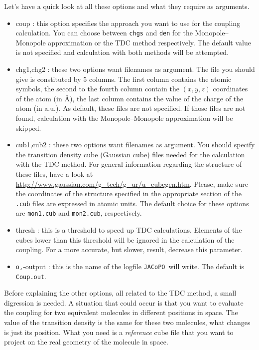\documentclass[a4paper]{article}
\newcommand{\jacopo}{\texttt{JACoPO}}
\begin{document}
Let's have a quick look at all these options and what they require as arguments.

\begin{itemize}

 \item \verb --coup : this option specifies the approach you want to use for the coupling calculation. You can choose between \verb|chgs| and \verb|den| for the Monopole--Monopole approximation or the TDC method respectively. The default value is not specified and calculation with both methods will be attempted.
 
 \item \verb --chg1,chg2 : these two options want filenames as argument. The file you should give is constituted by 5 columns. The first column contains the atomic symbols, the second to the fourth column contain the $(x, y, z)$ coordinates of the atom (in \AA{}), the last column contains the value of the charge of the atom (in a.u.). As default, these files are not specified. If those files are not found, calculation with the Monopole--Monopole approximation will be skipped.
 
 \item \verb --cub1,cub2 : these two options want filenames as argument. You should specify the transition density cube (Gaussian cube) files needed for the calculation with the TDC method. For general information regarding the structure of these files, have a look at \url{http://www.gaussian.com/g_tech/g_ur/u_cubegen.htm}. Please, make sure the coordinates of the structure specified in the appropriate section of the \verb|.cub| files are expressed in atomic units. The default choice for these options are \verb|mon1.cub| and \verb|mon2.cub|, respectively.

 \item \verb --thresh : this is a threshold to speed up TDC calculations. Elements of the cubes lower than this threshold will be ignored in the calculation of the coupling. For a more accurate, but slower, result, decrease this parameter.
 
 \item \verb -o,--output : this is the name of the logfile \jacopo\ will write. The default is \verb|Coup.out|.
 
\end{itemize}

Before explaining the other options, all related to the TDC method, a small digression is needed. A situation that could occur is that you want to evaluate the coupling for two equivalent molecules in different positions in space. The value of the transition density is the same for these two molecules, what changes is just its position. What you need is a \textit{reference} cube file that you want to project on the real geometry of the molecule in space.
\end{document}
